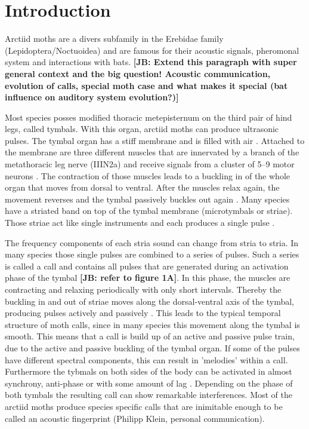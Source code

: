 \documentclass[12pt,a4paper]{article}
\newcommand{\note}[2][]{\textbf{[#1: #2]}}
\newcommand{\notejb}[1]{\note[JB]{#1}}
\begin{document}
\section{Introduction}
Arctiid moths are a divers subfamily in the Erebidae family (Lepidoptera/Noctuoidea) and are famous for their acoustic signals, pheromonal system and interactions with bats.
\notejb{Extend this paragraph with super general context and the big question! Acoustic communication, evolution of calls, special moth case and what makes it special (bat influence on auditory system evolution?)}

Most species posses modified thoracic metepisternum on the third  pair of hind legs, called tymbals. With this organ, arctiid moths can produce ultrasonic pulses. The tymbal organ has a stiff membrane and is filled with air \cite{blest1963, fullard1977, fullard1990}. Attached to the membrane are three different muscles that are innervated by a branch of the metathoracic leg nerve (IIIN2a) and receive signals from a cluster of 5--9 motor neurons \cite{nuesch1957, fullard1992}. The contraction of those muscles leads to a buckling in of the whole organ that moves from dorsal to ventral. After the muscles relax again, the movement reverses and the tymbal passively buckles out again \cite{blest1963}. Many species have a striated band on top of the tymbal membrane (microtymbals or striae). Those striae act like single instruments and each produces a single pulse \cite{blest1963, fullard1977, fullard1990, weller1999}.

The frequency components of each stria sound can change from stria to stria. In many species those single pulses are combined to a series of pulses. Such a series is called a call and contains all pulses that are generated during an activation phase of the tymbal \notejb{refer to figure 1A}. In this phase, the muscles are contracting and relaxing periodically with only short intervals. Thereby the buckling in and out of striae moves along the dorsal-ventral axis of the tymbal, producing pulses actively and passively \cite{corcoran2010}. This leads to the typical temporal structure of moth calls, since in many species this movement along the tymbal is smooth. This means that a call is build up of an active and passive pulse train, due to the active and passive buckling of the tymbal organ. If some of the pulses have different spectral components, this can result in 'melodies' within a call. Furthermore the tybmals on both sides of the body can be activated in almost synchrony, anti-phase or with some amount of lag \cite{fullard1977}. Depending on the phase of both tymbals the resulting call can show remarkable interferences. Most of the arctiid moths produce species specific calls that are inimitable enough to be called an acoustic fingerprint (Philipp Klein, personal communication). 
\end{document}
